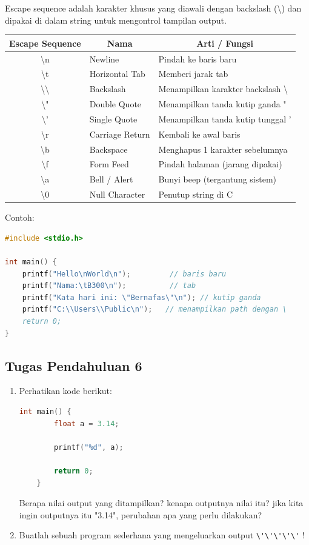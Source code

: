Escape sequence adalah karakter khusus yang diawali dengan backslash (\textbackslash) dan dipakai di dalam string untuk mengontrol tampilan output.
\begin{center}
	\begin{tabular}{|c|l|p{7.5cm}|}
		\hline
		\multicolumn{1}{|c|}{\textbf{Escape Sequence}} &
		\multicolumn{1}{c|}{\textbf{Nama}} &
		\multicolumn{1}{c|}{\textbf{Arti / Fungsi}} \\ \hline
		\textbackslash n   & Newline & Pindah ke baris baru \\ \hline
		\textbackslash t   & Horizontal Tab & Memberi jarak tab \\ \hline
		\textbackslash\textbackslash & Backslash & Menampilkan karakter backslash \textbackslash \\ \hline
		\textbackslash"   & Double Quote & Menampilkan tanda kutip ganda " \\ \hline
		\textbackslash'   & Single Quote & Menampilkan tanda kutip tunggal ' \\ \hline
		\textbackslash r   & Carriage Return & Kembali ke awal baris \\ \hline
		\textbackslash b   & Backspace & Menghapus 1 karakter sebelumnya \\ \hline
		\textbackslash f   & Form Feed & Pindah halaman (jarang dipakai) \\ \hline
		\textbackslash a   & Bell / Alert & Bunyi beep (tergantung sistem) \\ \hline
		\textbackslash 0   & Null Character & Penutup string di C \\ \hline
	\end{tabular}
\end{center}
Contoh:
\begin{lstlisting}[language=c]
#include <stdio.h>

int main() {
	printf("Hello\nWorld\n");         // baris baru
	printf("Nama:\tB300\n");          // tab
	printf("Kata hari ini: \"Bernafas\"\n"); // kutip ganda
	printf("C:\\Users\\Public\n");   // menampilkan path dengan \
	return 0;
}
\end{lstlisting}

\subsection*{Tugas Pendahuluan 6}
\begin{enumerate}
	\item Perhatikan kode berikut:
	\begin{lstlisting}[language=c]
	int main() {
		float a = 3.14;

		printf("%d", a);

		return 0;
	}
\end{lstlisting}
    Berapa nilai output yang ditampilkan? kenapa outputnya nilai itu? jika kita ingin outputnya itu "3.14", perubahan apa yang perlu dilakukan?
  	\item Buatlah sebuah program sederhana yang mengeluarkan output \verb|\'\'\'\'\'| !
\end{enumerate}

